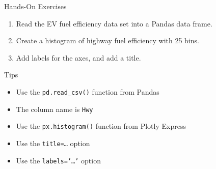 \documentclass[ignorenonframetext,xcolor=x11names]{beamer}
\begin{document}
\begin{frame}{Hands-On Exercises}
\begin{block}{}
\begin{enumerate}
    \item Read the EV fuel efficiency data set into a Pandas data frame.
    \item Create a histogram of highway fuel efficiency with 25 bins.
    \item Add labels for the axes, and add a title.
\end{enumerate}
\end{block}

\begin{block}{Tips}
    \begin{itemize} 
       \item Use the \texttt{pd.read\_csv()} function from Pandas
       \item The column name is \texttt{Hwy}
       \item Use the \texttt{px.histogram()} function from Plotly Express
       \item Use the \texttt{title=\ldots} option
       \item Use the \texttt{labels='\ldots'} option
    \end{itemize}
\end{block}
\end{frame}
\end{document}
